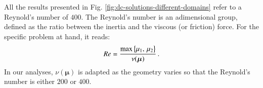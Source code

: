 \documentclass{elsarticle}
\numberwithin{equation}{section}
\theoremstyle{theorem}
\theoremstyle{definition}
\theoremstyle{remark}
\theoremstyle{proposition}
\numberwithin{figure}{section}
\newcommand{\bg}[1]{\boldsymbol{#1}}
\begin{document}
		All the results presented in Fig. \ref{fig:dc-solutions-different-domains} refer to a Reynold's number of $400$. The Reynold's number is an adimensional group, defined as the ratio between the inertia and the viscous (or friction) force. For the specific problem at hand, it reads:
		\begin{equation*}
			\vspace*{-0.1cm}
			Re = \dfrac{\max \big\lbrace \mu_1, \, \mu_2 \big\rbrace}{\nu(\bg{\mu})} \, .
		\end{equation*}
		In our analyses, $\nu(\bg{\mu})$ is adapted as the geometry varies so that the Reynold's number is either $200$ or $400$. \\[0.1cm] %
																							
\end{document}

